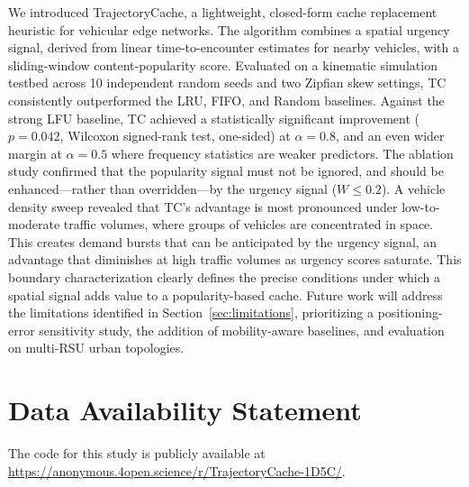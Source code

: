 \documentclass[preprint,12pt]{elsarticle}
\begin{document}
	We introduced TrajectoryCache, a lightweight, closed-form cache replacement heuristic for vehicular edge networks. The algorithm combines a spatial urgency signal, derived from linear time-to-encounter estimates for nearby vehicles, with a sliding-window content-popularity score. Evaluated on a kinematic simulation testbed across 10 independent random seeds and two Zipfian skew settings, TC consistently outperformed the LRU, FIFO, and Random baselines. Against the strong LFU baseline, TC achieved a statistically significant improvement ($p = 0.042$, Wilcoxon signed-rank test, one-sided) at $\alpha = 0.8$, and an even wider margin at $\alpha = 0.5$ where frequency statistics are weaker predictors. The ablation study confirmed that the popularity signal must not be ignored, and should be enhanced---rather than overridden---by the urgency signal ($W \leq 0.2$). A vehicle density sweep revealed that TC's advantage is most pronounced under low-to-moderate traffic volumes, where groups of vehicles are concentrated in space. This creates demand bursts that can be anticipated by the urgency signal, an advantage that diminishes at high traffic volumes as urgency scores saturate. This boundary characterization clearly defines the precise conditions under which a spatial signal adds value to a popularity-based cache. Future work will address the limitations identified in Section~\ref{sec:limitations}, prioritizing a positioning-error sensitivity study, the addition of mobility-aware baselines, and evaluation on multi-RSU urban topologies.

	\section*{Data Availability Statement}
	The code for this study is publicly available at \url{https://anonymous.4open.science/r/TrajectoryCache-1D5C/}.

	
	
	
	
\end{document}

